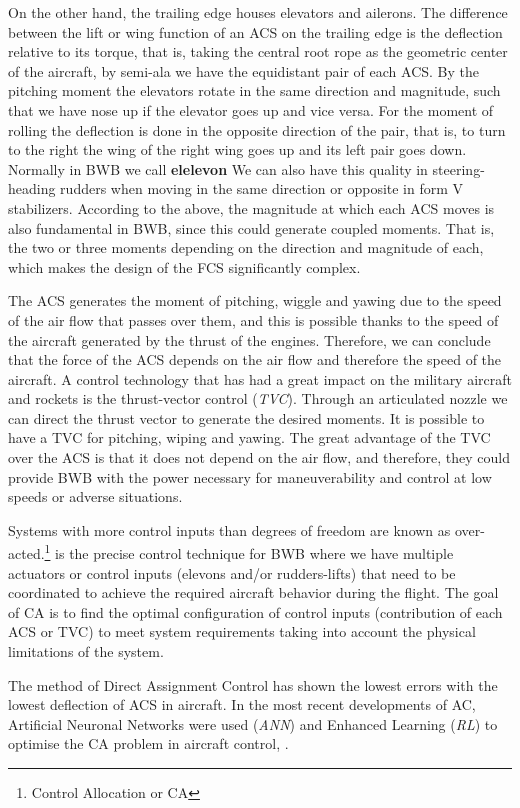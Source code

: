 On the other hand, the trailing edge houses elevators and ailerons. The difference between the lift or wing function of an ACS on the trailing edge is the deflection relative to its torque, that is, taking the central root rope as the geometric center of the aircraft, by semi-ala we have the equidistant pair of each ACS. By the pitching moment the elevators rotate in the same direction and magnitude, such that we have nose up if the elevator goes up and vice versa. 
%
For the moment of rolling the deflection is done in the opposite direction of the pair, that is, to turn to the right the wing of the right wing goes up and its left pair goes down. Normally in BWB we call \textbf{elelevon}  We can also have this quality in steering-heading rudders when moving in the same direction or opposite in form V stabilizers. 
%
According to the above, the magnitude at which each ACS moves is also fundamental in BWB, since this could generate coupled moments. That is, the two or three moments depending on the direction and magnitude of each, which makes the design of the FCS significantly complex. 

The ACS generates the moment of pitching, wiggle and yawing due to the speed of the air flow that passes over them, and this is possible thanks to the speed of the aircraft generated by the thrust of the engines. Therefore, we can conclude that the force of the ACS depends on the air flow and therefore the speed of the aircraft. A control technology that has had a great impact on the military aircraft and rockets is the thrust-vector control (\textit{TVC}). Through an articulated nozzle we can direct the thrust vector to generate the desired moments. It is possible to have a TVC for pitching, wiping and yawing. The great advantage of the TVC over the ACS is that it does not depend on the air flow, and therefore, they could provide BWB with the power necessary for maneuverability and control at low speeds or adverse situations. 

Systems with more control inputs than degrees of freedom are known as over-acted.\footnote{Control Allocation or CA} is the precise control technique for BWB where we have multiple actuators or control inputs (elevons and/or rudders-lifts) that need to be coordinated to achieve the required aircraft behavior during the flight. The goal of CA is to find the optimal configuration of control inputs (contribution of each ACS or TVC) to meet system requirements taking into account the physical limitations of the system. 

The method of Direct Assignment Control has shown the lowest errors with the lowest deflection of ACS in aircraft. In the most recent developments of AC, Artificial Neuronal Networks were used (\textit{ANN}) and Enhanced Learning (\textit{RL}) to optimise the CA problem in aircraft control, \cite{Yann2016}. 

